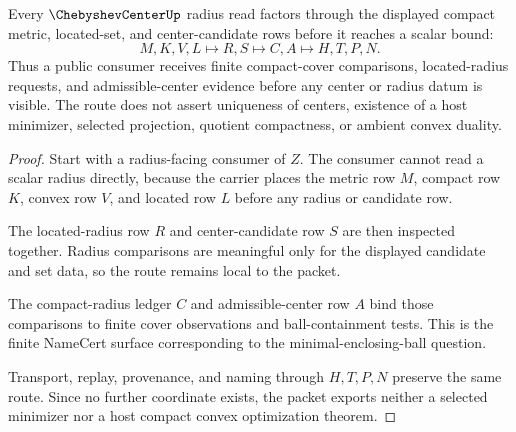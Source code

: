 \begin{theorem}
\label{thm:chebyshev-center-compact-radius-ledger}
Every $\ChebyshevCenterUp$ radius read factors through the displayed compact metric, located-set, and center-candidate rows before it reaches a scalar bound:
$$
M,K,V,L \longmapsto R,S \longmapsto C,A \longmapsto H,T,P,N .
$$
Thus a public consumer receives finite compact-cover comparisons, located-radius requests, and admissible-center evidence before any center or radius datum is visible. The route does not assert uniqueness of centers, existence of a host minimizer, selected projection, quotient compactness, or ambient convex duality.
\end{theorem}
\begin{proof}
Start with a radius-facing consumer of $Z$. The consumer cannot read a scalar radius directly, because the carrier places the metric row $M$, compact row $K$, convex row $V$, and located row $L$ before any radius or candidate row.

The located-radius row $R$ and center-candidate row $S$ are then inspected together. Radius comparisons are meaningful only for the displayed candidate and set data, so the route remains local to the packet.

The compact-radius ledger $C$ and admissible-center row $A$ bind those comparisons to finite cover observations and ball-containment tests. This is the finite NameCert surface corresponding to the minimal-enclosing-ball question.

Transport, replay, provenance, and naming through $H,T,P,N$ preserve the same route. Since no further coordinate exists, the packet exports neither a selected minimizer nor a host compact convex optimization theorem.
\end{proof}



